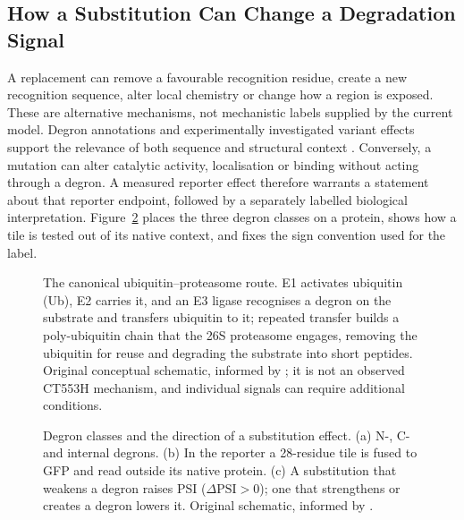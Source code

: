 \subsection{How a Substitution Can Change a Degradation Signal}
A replacement can remove a favourable recognition residue, create a new recognition sequence,
alter local chemistry or change how a region is exposed. These are alternative mechanisms, not
mechanistic labels supplied by the current model. Degron annotations and experimentally investigated
variant effects support the relevance of both sequence and structural context
\citep{degronopedia,degronmd,voutsinos2026}. Conversely, a mutation can alter catalytic activity,
localisation or binding without acting through a degron. A measured reporter effect therefore warrants
a statement about that reporter endpoint, followed by a separately labelled biological interpretation.
Figure~\ref{fig:degron-types} places the three degron classes on a protein, shows how a tile is tested
out of its native context, and fixes the sign convention used for the label.

\begin{figure}[htbp]
  \centering
  
  \caption[The canonical ubiquitin--proteasome route]{The canonical ubiquitin--proteasome route. E1 activates ubiquitin (Ub), E2 carries it, and an
  E3 ligase recognises a degron on the substrate and transfers ubiquitin to it; repeated transfer
  builds a poly-ubiquitin chain that the 26S proteasome engages, removing the ubiquitin for reuse and
  degrading the substrate into short peptides. Original conceptual schematic, informed by
  \citep{varshavsky2019,koren2018}; it is not an observed CT553H mechanism, and individual signals can
  require additional conditions.}
  \label{fig:ups-concept}
\end{figure}


\begin{figure}[htbp]
  \centering
  
  \caption[Degron classes and the direction of a substitution effect]{Degron classes and the direction of a substitution effect. (a) N-, C- and internal degrons. (b) In the reporter a 28-residue tile is fused to GFP and read outside its native protein. (c) A substitution that weakens a degron raises PSI ($\Delta\mathrm{PSI}>0$); one that strengthens or creates a degron lowers it. Original schematic, informed by \citep{varshavsky2019,koren2018,zhang2023}.}
  \label{fig:degron-types}
\end{figure}

